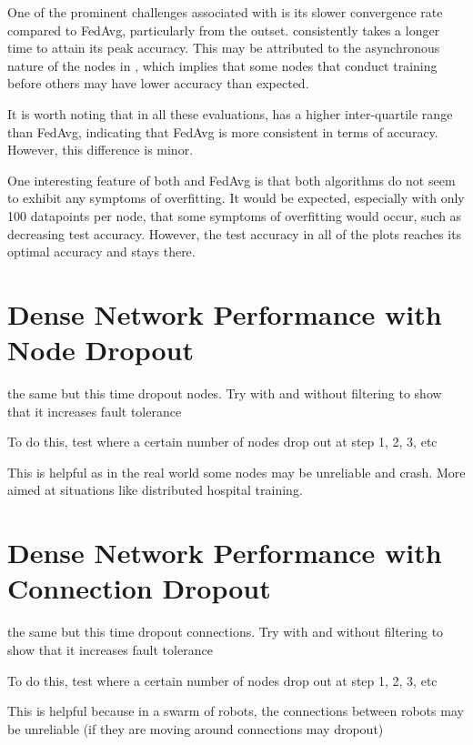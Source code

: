 One of the prominent challenges associated with \SL is its slower convergence rate compared to FedAvg, particularly from the outset. \SL consistently takes a longer time to attain its peak accuracy. This may be attributed to the asynchronous nature of the nodes in \SL, which implies that some nodes that conduct training before others may have lower accuracy than expected.

It is worth noting that in all these evaluations, \SL has a higher inter-quartile range than FedAvg, indicating that FedAvg is more consistent in terms of accuracy. However, this difference is minor.

One interesting feature of both \SL and FedAvg is that both algorithms do not seem to exhibit any symptoms of overfitting. It would be expected, especially with only 100 datapoints per node, that some symptoms of overfitting would occur, such as decreasing test accuracy. However, the test accuracy in all of the plots reaches its optimal accuracy and stays there.

\section{Dense Network Performance with Node Dropout}


the same but this time dropout nodes. Try with and without filtering to show that it increases fault tolerance

To do this, test where a certain number of nodes drop out at step 1, 2, 3, etc

This is helpful as in the real world some nodes may be unreliable and crash. More aimed at situations like distributed hospital training.

\section{Dense Network Performance with Connection Dropout}


the same but this time dropout connections. Try with and without filtering to show that it increases fault tolerance

To do this, test where a certain number of nodes drop out at step 1, 2, 3, etc

This is helpful because in a swarm of robots, the connections between robots may be unreliable (if they are moving around connections may dropout)

